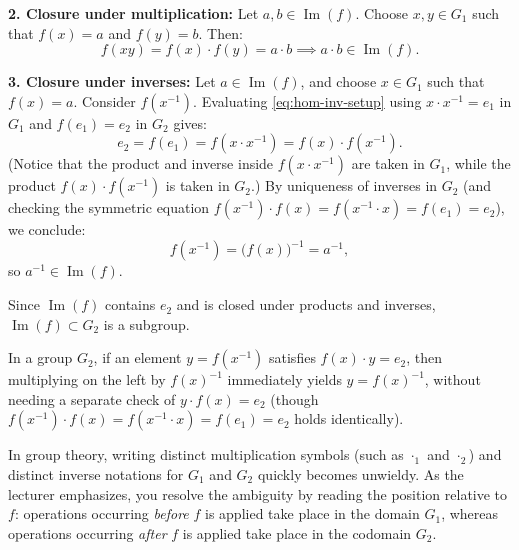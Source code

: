 \begin{proofWrapper}
\begin{content}
\textbf{2. Closure under multiplication:} Let $a, b \in \operatorname{Im}(f)$. Choose $x, y \in G_1$ such that $f(x) = a$ and $f(y) = b$. Then:
\[
f(xy) = f(x) \cdot f(y) = a \cdot b \implies a \cdot b \in \operatorname{Im}(f).
\]

\textbf{3. Closure under inverses:} Let $a \in \operatorname{Im}(f)$, and choose $x \in G_1$ such that $f(x) = a$. Consider $f(x^{-1})$. Evaluating \eqref{eq:hom-inv-setup} using $x \cdot x^{-1} = e_1$ in $G_1$ and $f(e_1) = e_2$ in $G_2$ gives:
\[
e_2 = f(e_1) = f(x \cdot x^{-1}) = f(x) \cdot f(x^{-1}).
\]
(Notice that the product and inverse inside $f(x \cdot x^{-1})$ are taken in $G_1$, while the product $f(x) \cdot f(x^{-1})$ is taken in $G_2$.) By uniqueness of inverses in $G_2$ (and checking the symmetric equation $f(x^{-1}) \cdot f(x) = f(x^{-1} \cdot x) = f(e_1) = e_2$), we conclude:
\[
f(x^{-1}) = \bigl(f(x)\bigr)^{-1} = a^{-1},
\]
so $a^{-1} \in \operatorname{Im}(f)$.

Since $\operatorname{Im}(f)$ contains $e_2$ and is closed under products and inverses, $\operatorname{Im}(f) \subset G_2$ is a subgroup.

\begin{steps}[Why One Side of \texorpdfstring{$f(x \cdot x^{-1}) = e_2$}{f(x * x\textasciicircum -1) = e\_2} Suffices]
In a group $G_2$, if an element $y = f(x^{-1})$ satisfies $f(x) \cdot y = e_2$, then multiplying on the left by $f(x)^{-1}$ immediately yields $y = f(x)^{-1}$, without needing a separate check of $y \cdot f(x) = e_2$ (though $f(x^{-1}) \cdot f(x) = f(x^{-1} \cdot x) = f(e_1) = e_2$ holds identically).
\end{steps}
\end{content}

\end{proofWrapper}

\begin{insight}
In group theory, writing distinct multiplication symbols (such as $\cdot_1$ and $\cdot_2$) and distinct inverse notations for $G_1$ and $G_2$ quickly becomes unwieldy. As the lecturer emphasizes, you resolve the ambiguity by reading the position relative to $f$: operations occurring \emph{before} $f$ is applied take place in the domain $G_1$, whereas operations occurring \emph{after} $f$ is applied take place in the codomain $G_2$.
\end{insight}

\begin{hidden}
\end{hidden}

